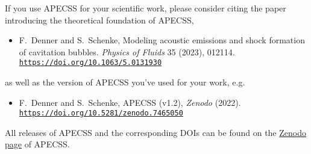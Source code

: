 If you use APECSS for your scientific work, please consider citing the paper introducing the theoretical foundation of APECSS,\vspace{-0.5em}
\begin{itemize}[leftmargin=*]
  \item[] F.~Denner and S.~Schenke, Modeling acoustic emissions and shock formation of cavitation bubbles. \textit{Physics of Fluids} 35 (2023), 012114. \href{https://doi.org/10.1063/5.0131930}{\texttt{https://doi.org/10.1063/5.0131930}} 
\end{itemize}\vspace{-0.5em}
as well as the version of APECSS you've used for your work, e.g.\vspace{-0.5em}
\begin{itemize}[leftmargin=*]
  \item[] F.~Denner and S.~Schenke, APECSS (v1.2), \textit{Zenodo} (2022). \\ \href{https://doi.org/10.5281/zenodo.7465050}{\texttt{https://doi.org/10.5281/zenodo.7465050}}
\end{itemize}\vspace{-0.5em}
All releases of APECSS and the corresponding DOIs can be found on the \href{https://doi.org/10.5281/zenodo.7249297}{Zenodo page} of APECSS.



